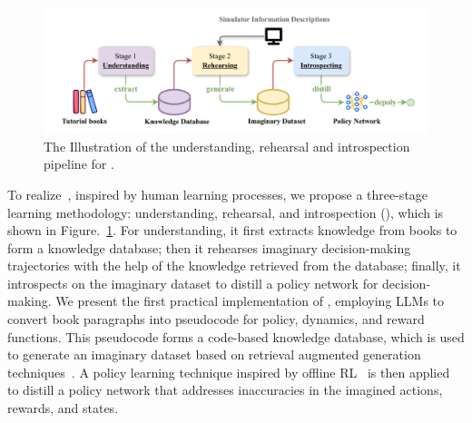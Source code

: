 \begin{figure}[h]
    \centering
    \includegraphics[width=\linewidth]{fig/framework_new.drawio (1).pdf}
    \caption{The Illustration of the understanding, rehearsal and introspection pipeline for \topic.}
    \label{fig:framework}
\end{figure}

To realize~\topic, inspired by human learning processes, we propose a three-stage learning methodology: understanding, rehearsal, and introspection (\algo), which is shown in Figure.~\ref{fig:framework}.  
For understanding, it first extracts knowledge from books to form a knowledge database; then it rehearses imaginary decision-making trajectories with the help of the knowledge retrieved from the database; finally, it introspects on the imaginary dataset to distill a policy network for decision-making.
We present the first practical implementation of \algo, employing LLMs to convert book paragraphs into pseudocode for policy, dynamics, and reward functions. 
This pseudocode forms a code-based knowledge database, which is used to generate an imaginary dataset based on retrieval augmented generation techniques~\citep{rag@2020patick}. A policy learning technique inspired by offline RL~\citep{mopo@2020tianhe} is then applied to distill a policy network that addresses inaccuracies in the imagined actions, rewards, and states.




